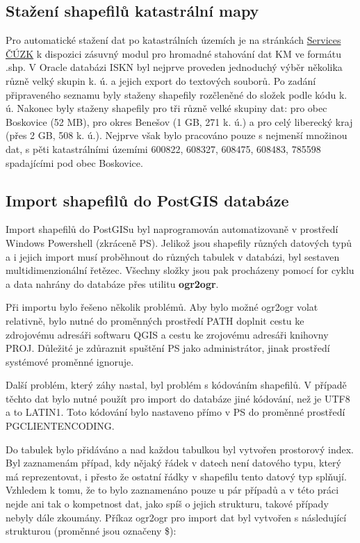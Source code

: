 \documentclass[12pt]{article}
\begin{document}
\subsection{Stažení shapefilů katastrální mapy} 
Pro automatické stažení dat po katastrálních územích je na stránkách \href{http://services.cuzk.cz/shp/ku/QGIS-plugin/QGIS_verze-3.x/}{Services ČÚZK} k dispozici zásuvný modul pro hromadné stahování dat KM ve formátu .shp. V Oracle databázi ISKN byl nejprve proveden jednoduchý výběr několika různě velký skupin k. ú. a jejich export do textových souborů. Po zadání připraveného seznamu byly staženy shapefily rozčleněné do složek podle kódu k. ú. Nakonec byly staženy shapefily pro tři různě velké skupiny dat:  pro obec Boskovice (52 MB), pro okres Benešov (1 GB, 271 k. ú.) a pro celý liberecký kraj (přes 2 GB, 508 k. ú.). Nejprve však bylo pracováno pouze s nejmenší množinou dat, s pěti katastrálními územími 600822, 608327, 608475, 608483, 785598 spadajícími pod obec Boskovice. 

\subsection{Import shapefilů do PostGIS databáze}
Import shapefilů do PostGISu byl naprogramován automatizovaně v prostředí Windows Powershell (zkráceně PS). Jelikož jsou shapefily různých datových typů a i jejich import musí proběhnout do různých tabulek v databázi, byl sestaven multidimenzionální řetězec. Všechny složky jsou pak procházeny pomocí for cyklu a data nahrány do databáze přes utilitu \textbf{ogr2ogr}.

Při importu bylo řešeno několik problémů. Aby bylo možné ogr2ogr volat relativně, bylo nutné do proměnných prostředí PATH doplnit cestu ke zdrojovému adresáři softwaru QGIS a cestu ke zrojovému adresáři knihovny PROJ. Důležité je zdůraznit spuštění PS jako administrátor, jinak prostředí systémové proměnné ignoruje.

Další problém, který záhy nastal, byl problém s kódováním shapefilů. V případě těchto dat bylo nutné použít pro import do databáze jiné kódování, než je UTF8 a to LATIN1. Toto kódování bylo nastaveno přímo v PS do proměnné prostředí PGCLIENTENCODING.

Do tabulek bylo přidáváno a nad každou tabulkou byl vytvořen prostorový index. Byl zaznamenám případ, kdy nějaký řádek v datech není datového typu, který má reprezentovat, i přesto že ostatní řádky v shapefilu tento datový typ splňují. Vzhledem k tomu, že to bylo zaznamenáno pouze u pár případů a v této práci nejde ani tak o kompetnost dat, jako spíš o jejich strukturu, takové případy nebyly dále zkoumány. Příkaz ogr2ogr pro import dat byl vytvořen s následující strukturou (proměnné jsou označeny \$):
\end{document}

